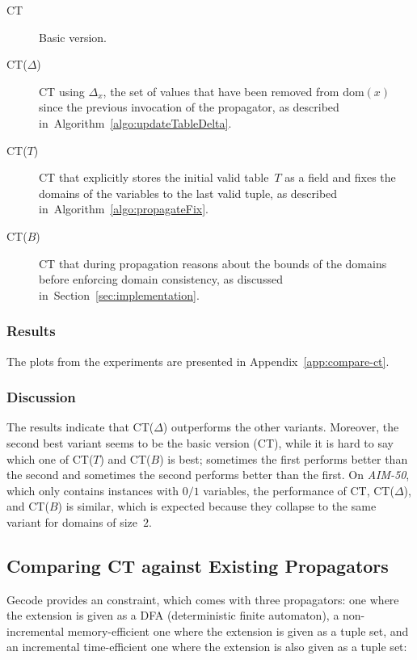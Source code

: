 \documentclass[a4paper,11pt]{article}
\theoremstyle{definition}
\newcommand{\Secref}[1]{Section~\ref{#1}}
\newcommand{\Algoref}[1]{Algorithm~\ref{#1}}
\newcommand{\Dom}[1]{\text{dom}({#1})}
\numberwithin{equation}{section}
\begin{document}
\begin{description}
  \item[CT] Basic version.
  \item[CT($\Delta$)] CT using $\Delta_x$, the set
    of values that have been removed from $\Dom{x}$
    since the previous invocation of the propagator,
    as described in~\Algoref{algo:updateTableDelta}.
  \item[CT($T$)] CT that explicitly stores the initial valid table~$T$ as
    a field and
    fixes the domains of the variables to the last valid tuple, as described
    in~\Algoref{algo:propagateFix}.
  \item[CT($B$)] CT that during propagation reasons about the bounds of the domains before
    enforcing domain consistency, as discussed in~\Secref{sec:implementation}.
\end{description}

\subsubsection{Results}

The plots from the experiments are presented in Appendix~\ref{app:compare-ct}.

\subsubsection{Discussion}
The results indicate that CT($\Delta$) outperforms the other variants.
Moreover, the second best variant seems to be the basic version (CT),
while it is hard to say which one of CT($T$) and CT($B$) is best;
sometimes the first performs better than the second and sometimes
the second performs better than the first.
On \emph{AIM-50}, which only contains instances
with $0/1$ variables, the performance of CT, CT($\Delta$), and CT($B$) is
similar, which is expected because they collapse to the same variant
for domains of size~$2$.

\subsection{Comparing CT against Existing Propagators}

Gecode provides an  constraint, which
comes with three propagators: one where the extension
is given as a DFA (deterministic finite automaton),
a non-incremental memory-efficient one where
the extension is given as a tuple set, and an incremental
time-efficient one where the extension is also given as a tuple set:
\end{document}
